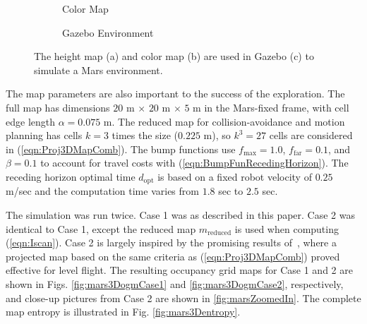\documentclass[conf]{new-aiaa}
\newcommand{\refeqn}[1]{(\ref{eqn:#1})}
\begin{document}
\begin{figure}[!t]
\begin{subfigure}[t]{0.3\columnwidth}
        		\caption{Color Map}
    	\end{subfigure}
    	\begin{subfigure}[t]{0.3\columnwidth}
        		\caption{Gazebo Environment}
    	\end{subfigure}
\caption{The height map (a) and color map (b) are used in Gazebo (c) to simulate a Mars environment.}
\label{fig:MarsGazebo}
\end{figure}

The map parameters are also important to the success of the exploration. The full map has dimensions $20$ m $\times$ $20$ m $\times$ $5$ m in the Mars-fixed frame, with cell edge length $\alpha=0.075$ m. The reduced map for collision-avoidance and motion planning has cells $k=3$ times the size ($0.225$ m), so $k^3=27$ cells are considered in \refeqn{Proj3DMapComb}. The bump functions use $f_\text{max}=1.0$, $f_\text{far}=0.1$, and $\beta=0.1$ to account for travel costs with \refeqn{BumpFunRecedingHorizon}. The receding horizon optimal time $d_\text{opt}$ is based on a fixed robot velocity of $0.25$ m/sec and the computation time varies from $1.8$ sec to $2.5$ sec.

The simulation was run twice. Case 1 was as described in this paper. Case 2 was identical to Case 1, except the reduced map $ m_\text{reduced}$ is used when computing \refeqn{Iscan}. Case 2 is largely inspired by the promising results of~\cite{KauTakAiLee18}, where a projected map based on the same criteria as \refeqn{Proj3DMapComb} proved effective for level flight. The resulting occupancy grid maps for Case 1 and 2 are shown in Figs. \ref{fig:mars3DogmCase1} and \ref{fig:mars3DogmCase2}, respectively, and close-up pictures from Case 2 are shown in \ref{fig:marsZoomedIn}. The complete map entropy is illustrated in Fig. \ref{fig:mars3Dentropy}.
\end{document}
